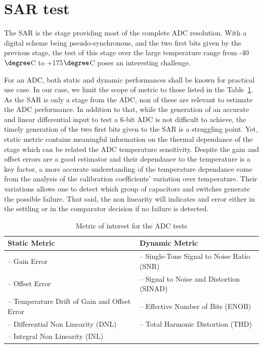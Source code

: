 

\section{SAR test}
The SAR is the stage providing most of the complete ADC resolution. With a digital scheme being pseudo-synchronous, and the two first bits given by the previous stage, the test of this stage over the large temperature range from -40\(\degree \)C to +175\(\degree \)C poses an interesting challenge.

For an ADC, both static and dynamic performances shall be known for practical use case. In our case, we limit the scope of metric to those listed in the Table~\ref{tbl:adc-metric-subset}. As the SAR is only a stage from the ADC, non of these are relevant to estimate the ADC performance. In addition to that, while the generation of an accurate and linear differential input to test a 6-bit ADC is not difficult to achieve, the timely generation of the two first bits given to the SAR is a struggling point. Yet, static metric contains meaningful information on the thermal dependance of the stage which can be related the ADC temperature sensitivity. Despite the gain and offset errors are a good estimator and their dependance to the temperature is a key factor, a more accurate understanding of the temperature dependance come from the analysis of the calibration coefficients' variation over temperature. Their variations allows one to detect which group of capacitors and switches generate the possible failure. That said, the non linearity will indicates and error either in the settling or in the comparator decision if no failure is detected.

\begin{table}[htp]
    \centering
    \caption{Metric of interest for the ADC tests}
    \label{tbl:adc-metric-subset}
    \begin{tabular}{l|l}
        \toprule
        \textbf{Static Metric} & \textbf{Dynamic Metric} \\ \midrule
        -- Gain Error & -- Single-Tone Signal to Noise Ratio (SNR)\\
        -- Offset Error & -- Signal to Noise and Distortion (SINAD)\\
        -- Temperature Drift of Gain and Offset Error & -- Effective Number of Bits (ENOB)\\
        -- Differential Non Linearity (DNL) & -- Total Harmonic Distortion (THD) \\
        -- Integral Non Linearity (INL) & \\ \bottomrule
    \end{tabular}
\end{table}

